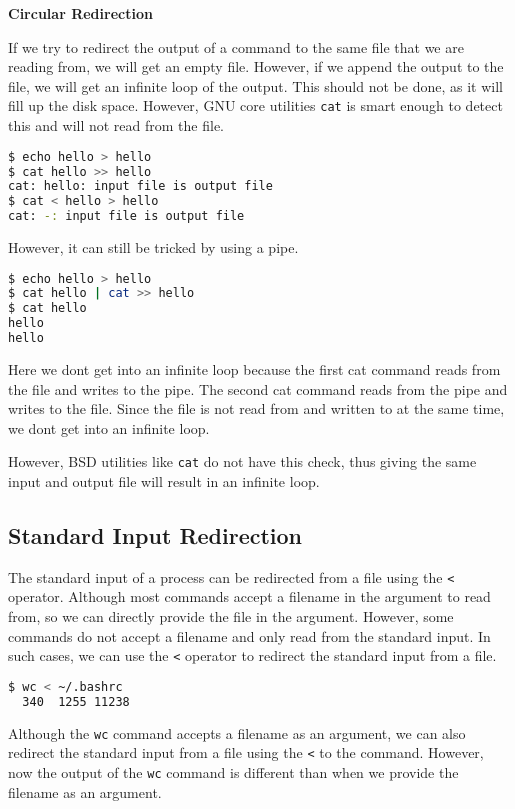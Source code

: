 \textbf{Circular Redirection}

If we try to redirect the output of a command to the same file that
we are reading from, we will get an empty file. However, if we append
the output to the file, we will get an infinite loop of the output.
This should not be done, as it will fill up the disk space.
However, GNU core utilities \lstinline|cat| is smart enough to detect
this and will not read from the file.

\begin{lstlisting}[language=bash]
$ echo hello > hello
$ cat hello >> hello
cat: hello: input file is output file
$ cat < hello > hello
cat: -: input file is output file
\end{lstlisting}

However, it can still be tricked by using a pipe.

\begin{lstlisting}[language=bash]
$ echo hello > hello
$ cat hello | cat >> hello
$ cat hello
hello
hello
\end{lstlisting}

Here we dont get into an infinite loop because the first cat command
reads from the file and writes to the pipe. The second cat command
reads from the pipe and writes to the file. Since the file is not
read from and written to at the same time, we dont get into an infinite
loop.

However, BSD utilities like \lstinline|cat| do not have this check, thus
giving the same input and output file will result in an infinite loop.

\subsection{Standard Input Redirection}

The standard input of a process can be redirected from a file using
the \lstinline|<| operator. Although most commands accept a filename
in the argument to read from, so we can directly provide the file
in the argument. However, some commands do not accept a filename
and only read from the standard input. In such cases, we can use
the \lstinline|<| operator to redirect the standard input from a file.

\begin{lstlisting}[language=bash]
$ wc < ~/.bashrc
  340  1255 11238
\end{lstlisting}

Although the \lstinline|wc| command accepts a filename as an argument,
we can also redirect the standard input from a file using the \lstinline|<|
to the command. However, now the output of the \lstinline|wc| command
is different than when we provide the filename as an argument.

